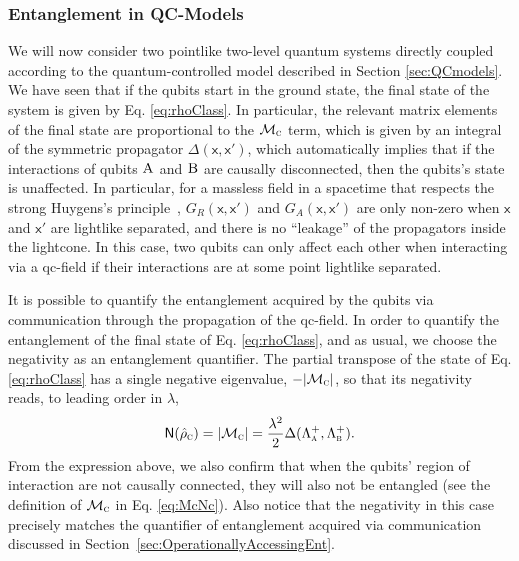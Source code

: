 \documentclass[letterpaper,12pt,titlepage,oneside,final]{book}
\newcommand{\mf}{\mathsf}%
\newcommand{\tc}[1]{\textsc{#1}}
\begin{document}
\subsubsection*{Entanglement in QC-Models}

We will now consider two pointlike two-level quantum systems directly coupled according to the quantum-controlled model described in Section \ref{sec:QCmodels}. We have seen that if the qubits start in the ground state, the final state of the system is given by Eq. \eqref{eq:rhoClass}. In particular, the relevant matrix elements of the final state are proportional to the $\mathcal{M}_\tc{c}$ term, which is given by an integral of the symmetric propagator $\Delta(\mf x,\mf x')$, which automatically implies that if the interactions of qubits $\tc{A}$ and $\tc{B}$ are causally disconnected, then the qubits's state is unaffected. In particular, for a massless field in a spacetime that respects the strong Huygens's principle~\cite{Hyugens1,RayHyugens,Huygens2}, $G_R(\mf x, \mf x')$ and $G_A(\mf x,\mf x')$ are only non-zero when $\mf x$ and $\mf x'$ are lightlike separated, and there is no ``leakage'' of the propagators inside the lightcone. In this case, two qubits can only affect each other when interacting via a qc-field if their interactions are at some point lightlike separated. %

It is possible to quantify the entanglement acquired by the qubits via communication through the propagation of the {qc-field}. In order to quantify the entanglement of the final state of Eq. \eqref{eq:rhoClass}, and as usual, we choose the negativity as an entanglement quantifier. The partial transpose of the state of Eq. \eqref{eq:rhoClass} has a single negative eigenvalue, $-|\mathcal{M}_\tc{c}|$, so that its negativity reads, to leading order in $\lambda$,
\begin{equation}\label{eq:NegC}
    \mf{N}(\hat{\rho}_\tc{c}) = |\mathcal{M}_\tc{c}| = \frac{\lambda^2}{2}\Delta(\Lambda_\tc{a}^+,\Lambda_\tc{b}^+).
\end{equation}
From the expression above, we also confirm that when the qubits' region of interaction are not causally connected, they will also not be entangled (see the definition of $\mathcal{M}_\tc{c}$ in Eq. \eqref{eq:McNc}). Also notice that the negativity in this case precisely matches the quantifier of entanglement acquired via communication discussed in Section~\ref{sec:OperationallyAccessingEnt}.
\end{document}
